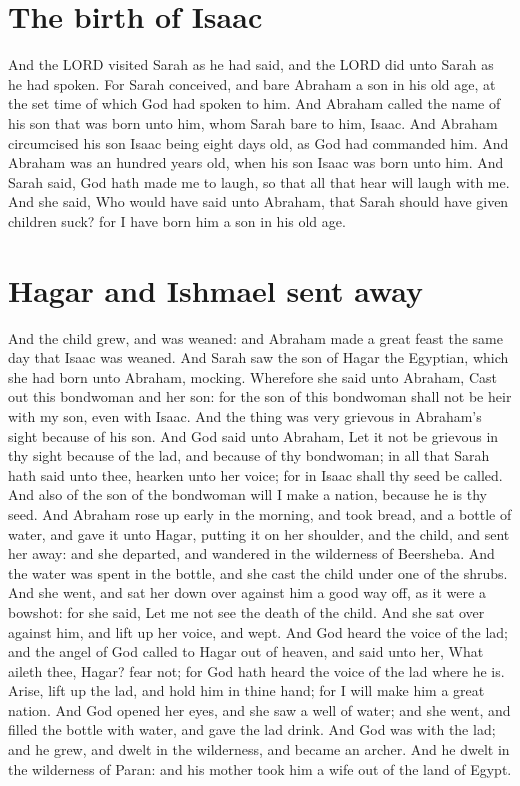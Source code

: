 \section*{The birth of Isaac}
\begin{biblechapter} %
\verse And the LORD visited Sarah as he had said, and the LORD did unto Sarah as he had spoken.
\verse For Sarah conceived, and bare Abraham a son in his old age, at the set time of which God had spoken to him.
\verse And Abraham called the name of his son that was born unto him, whom Sarah bare to him, Isaac.
\verse And Abraham circumcised his son Isaac being eight days old, as God had commanded him.
\verse And Abraham was an hundred years old, when his son Isaac was born unto him.
\verse And Sarah said, God hath made me to laugh, so that all that hear will laugh with me.
\verse And she said, Who would have said unto Abraham, that Sarah should have given children suck? for I have born him a son in his old age.
\section*{Hagar and Ishmael sent away}
\verse And the child grew, and was weaned: and Abraham made a great feast the same day that Isaac was weaned.
\verse And Sarah saw the son of Hagar the Egyptian, which she had born unto Abraham, mocking.
\verse Wherefore she said unto Abraham, Cast out this bondwoman and her son: for the son of this bondwoman shall not be heir with my son, even with Isaac.
\verse And the thing was very grievous in Abraham's sight because of his son.
\verse And God said unto Abraham, Let it not be grievous in thy sight because of the lad, and because of thy bondwoman; in all that Sarah hath said unto thee, hearken unto her voice; for in Isaac shall thy seed be called.
\verse And also of the son of the bondwoman will I make a nation, because he is thy seed.
\verse And Abraham rose up early in the morning, and took bread, and a bottle of water, and gave it unto Hagar, putting it on her shoulder, and the child, and sent her away: and she departed, and wandered in the wilderness of Beersheba.
\verse And the water was spent in the bottle, and she cast the child under one of the shrubs.
\verse And she went, and sat her down over against him a good way off, as it were a bowshot: for she said, Let me not see the death of the child. And she sat over against him, and lift up her voice, and wept.
\verse And God heard the voice of the lad; and the angel of God called to Hagar out of heaven, and said unto her, What aileth thee, Hagar? fear not; for God hath heard the voice of the lad where he is.
\verse Arise, lift up the lad, and hold him in thine hand; for I will make him a great nation.
\verse And God opened her eyes, and she saw a well of water; and she went, and filled the bottle with water, and gave the lad drink.
\verse And God was with the lad; and he grew, and dwelt in the wilderness, and became an archer.
\verse And he dwelt in the wilderness of Paran: and his mother took him a wife out of the land of Egypt.

\end{biblechapter}

